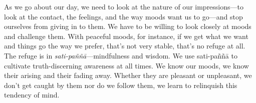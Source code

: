 As we go about our day, we need to look at the nature of our 
impressions---to look at the contact, the feelings, and the way moods 
want us to go---and stop ourselves from giving in to them. We have to 
be willing to look closely at moods and challenge them. With peaceful 
moods, for instance, if we get what we want and things go the way we 
prefer, that's not very stable, that's no refuge at all. The refuge is 
in \emph{sati-paññā}---mindfulness and wisdom. We use sati-paññā 
to cultivate truth-discerning awareness at all times. We know our 
moods, we know their arising and their fading away. Whether they are 
pleasant or unpleasant, we don't get caught by them nor do we follow 
them, we learn to relinquish this tendency of mind.


